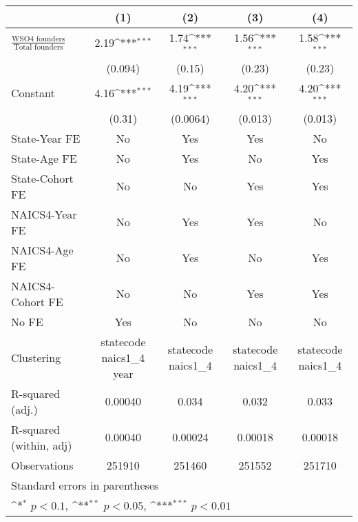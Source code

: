 {
\def\sym#1{\ifmmode^{#1}\else\(^{#1}\)\fi}
\begin{tabular}{l*{4}{c}}
\toprule
                    &\multicolumn{1}{c}{(1)}         &\multicolumn{1}{c}{(2)}         &\multicolumn{1}{c}{(3)}         &\multicolumn{1}{c}{(4)}         \\
\midrule
$\frac{\text{WSO4 founders}}{\text{Total founders}}$&        2.19\sym{***}&        1.74\sym{***}&        1.56\sym{***}&        1.58\sym{***}\\
                    &     (0.094)         &      (0.15)         &      (0.23)         &      (0.23)         \\
\addlinespace
Constant            &        4.16\sym{***}&        4.19\sym{***}&        4.20\sym{***}&        4.20\sym{***}\\
                    &      (0.31)         &    (0.0064)         &     (0.013)         &     (0.013)         \\
\addlinespace
State-Year FE       &          No         &         Yes         &         Yes         &          No         \\
\addlinespace
State-Age FE        &          No         &         Yes         &          No         &         Yes         \\
\addlinespace
State-Cohort FE     &          No         &          No         &         Yes         &         Yes         \\
\addlinespace
NAICS4-Year FE      &          No         &         Yes         &         Yes         &          No         \\
\addlinespace
NAICS4-Age FE       &          No         &         Yes         &          No         &         Yes         \\
\addlinespace
NAICS4-Cohort FE    &          No         &          No         &         Yes         &         Yes         \\
\addlinespace
No FE               &         Yes         &          No         &          No         &          No         \\
\midrule
Clustering          &statecode naics1\_4 year         &statecode naics1\_4         &statecode naics1\_4         &statecode naics1\_4         \\
R-squared (adj.)    &     0.00040         &       0.034         &       0.032         &       0.033         \\
R-squared (within, adj)&     0.00040         &     0.00024         &     0.00018         &     0.00018         \\
Observations        &      251910         &      251460         &      251552         &      251710         \\
\bottomrule
\multicolumn{5}{l}{\footnotesize Standard errors in parentheses}\\
\multicolumn{5}{l}{\footnotesize \sym{*} \(p<0.1\), \sym{**} \(p<0.05\), \sym{***} \(p<0.01\)}\\
\end{tabular}
}
